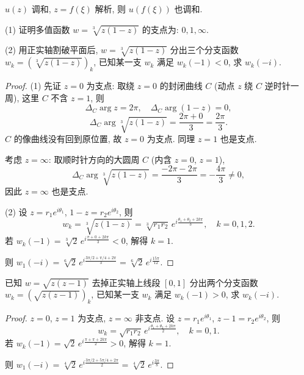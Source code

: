 \documentclass[theorem=false,mathfont=none,openany,sub3section]{easybook}
\begin{document}
\begin{corollary}
  $u(z)$ 调和, $z=f(\xi)$ 解析, 则 $u(f(\xi))$ 也调和.
\end{corollary}

\begin{example}
  (1) 证明多值函数 $w=\sqrt[3]{z(1-z)}$ 的支点为: $0,1,\infty$.\par
  (2) 用正实轴割破平面后, $w=\sqrt[3]{z(1-z)}$ 分出三个分支函数 $w_{k}=(\sqrt[3]{z(1-z)})_{k}$, 已知某一支 $w_{k}$ 满足 $w_{k}(-1)<0$, 求 $w_{k}(-i)$.
\end{example}

\begin{proof}
  (1) 先证 $z=0$ 为支点: 取绕 $z=0$ 的封闭曲线 $C$ (动点 $z$ 绕 $C$ 逆时针一周), 这里 $C$ 不含 $z=1$, 则
  \[
  \Delta_{C}\arg z=2\pi,\quad \Delta_{C}\arg(1-z)=0,
  \]
  \[
  \Delta_{C}\arg\sqrt[3]{z(1-z)}=\frac{2\pi+0}{3}=\frac{2\pi}{3}.
  \]
  $C$ 的像曲线没有回到原位置, 故 $z=0$ 为支点. 同理 $z=1$ 也是支点.\par
  考虑 $z=\infty$: 取顺时针方向的大圆周 $C$ (内含 $z=0$, $z=1$),
  \[
  \Delta_{C}\arg\sqrt[3]{z(1-z)}=\frac{-2\pi-2\pi}{3}=-\frac{4\pi}{3}\neq0,
  \]
  因此 $z=\infty$ 也是支点.\par
  (2) 设 $z=r_{1}e^{i\theta_{1}}$, $1-z=r_{2}e^{i\theta_{2}}$, 则
  \[
  w_{k}=\sqrt[3]{z(1-z)}=\sqrt[3]{r_{1}r_{2}}\,e^{i\frac{\theta_{1}+\theta_{2}+2k\pi}{3}},\quad k=0,1,2.
  \]
  若 $w_{k}(-1)=\sqrt[3]{2}\,e^{i\frac{\pi+0+2k\pi}{3}}<0$, 解得 $k=1$.\par
  则 $w_{1}(-i)=\sqrt[6]{2}\,e^{i\frac{3\pi/2+\pi/4+2\pi}{3}}=\sqrt[6]{2}\,e^{i\frac{15\pi}{12}}$.
\end{proof}

\begin{example}
  已知 $w=\sqrt{z(z-1)}$ 去掉正实轴上线段 $[0,1]$ 分出两个分支函数 $w_{k}=(\sqrt{z(z-1)})_{k}$, 已知某一支 $w_{k}$ 满足 $w_{k}(-1)>0$, 求 $w_{k}(-i)$.
\end{example}

\begin{proof}
  $z=0$, $z=1$ 为支点, $z=\infty$ 非支点.
  设 $z=r_{1}e^{i\theta_{1}}$, $z-1=r_{2}e^{i\theta_{2}}$, 则
  \[
  w_{k}=\sqrt{r_{1}r_{2}}\,e^{i\frac{\theta_{1}+\theta_{2}+2k\pi}{2}},\quad k=0,1.
  \]
  若 $w_{k}(-1)=\sqrt{2}\,e^{i\frac{\pi+\pi+2k\pi}{2}}>0$, 解得 $k=1$.\par
  则 $w_{1}(-i)=\sqrt[4]{2}\,e^{i\frac{3\pi/2+5\pi/4+2\pi}{2}}
  =\sqrt[4]{2}\,e^{i\frac{3\pi}{8}}$.
\end{proof}
\end{document}

